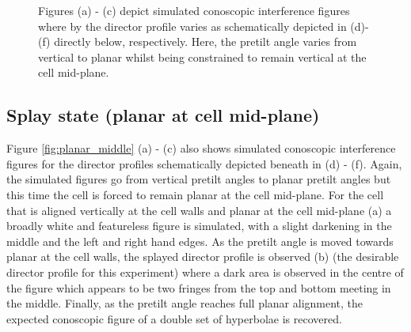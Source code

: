 \begin{figure}
\begin{center}
\end{center}
\caption[Simulated conoscopic figures - director vertical at mid-plane]{\label{fig:vertical_middle}Figures (a) - (c) depict simulated conoscopic interference figures where by the director profile varies as schematically depicted in (d)-(f) directly below, respectively. Here, the pretilt angle varies from vertical to planar whilst being constrained to remain vertical at the cell mid-plane.}
\end{figure}

\subsection{Splay state (planar at cell mid-plane)}
Figure \ref{fig:planar_middle} (a) - (c) also shows simulated conoscopic interference figures for the director profiles schematically depicted beneath in (d) - (f). Again, the simulated figures go from vertical pretilt angles to planar pretilt angles but this time the cell is forced to remain planar at the cell mid-plane. For the cell that is aligned vertically at the cell walls and planar at the cell mid-plane (a) a broadly white and featureless figure is simulated, with a slight darkening in the middle and the left and right hand edges. As the pretilt angle is moved towards planar at the cell walls, the splayed director profile is observed (b) (the desirable director profile for this experiment) where a dark area is observed in the centre of the figure which appears to be two fringes from the top and bottom meeting in the middle. Finally, as the pretilt angle reaches full planar alignment, the expected conoscopic figure of a double set of hyperbolae is recovered.

